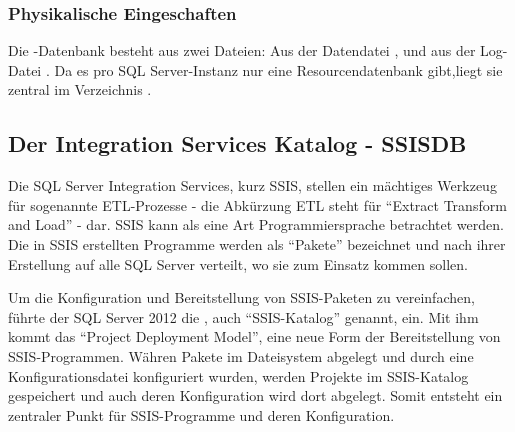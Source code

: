         \subsubsection{Physikalische Eingeschaften}
          Die -Datenbank besteht aus zwei
          Dateien: Aus der Datendatei
          , und aus der
          Log-Datei . Da es pro SQL
          Server-Instanz nur eine Resourcendatenbank gibt,liegt sie zentral im
          Verzeichnis .
          \begin{literaturinternet}
            \item \cite{ms190940}
          \end{literaturinternet}          
      \subsection{Der Integration Services Katalog - SSISDB}
        Die SQL Server Integration Services, kurz SSIS, stellen ein mächtiges
        Werkzeug für sogenannte ETL-Prozesse - die Abkürzung ETL steht 
        für \enquote{Extract Transform and Load} - dar. SSIS kann als eine Art
        Programmiersprache betrachtet werden. Die in SSIS erstellten Programme
        werden als \enquote{Pakete} bezeichnet und nach ihrer Erstellung auf
        alle SQL Server verteilt, wo sie zum Einsatz kommen sollen.
        
        Um die Konfiguration und Bereitstellung von SSIS-Paketen zu
        vereinfachen, führte der SQL Server 2012 die , auch
        \enquote{SSIS-Katalog} genannt, ein. Mit ihm kommt das \enquote{Project
        Deployment Model}, eine neue Form der Bereitstellung von
        SSIS-Programmen. Währen Pakete im Dateisystem abgelegt und durch eine
        Konfigurationsdatei konfiguriert wurden, werden Projekte im SSIS-Katalog
        gespeichert und auch deren Konfiguration wird dort abgelegt. Somit
        entsteht ein zentraler Punkt für SSIS-Programme und deren Konfiguration.
        
